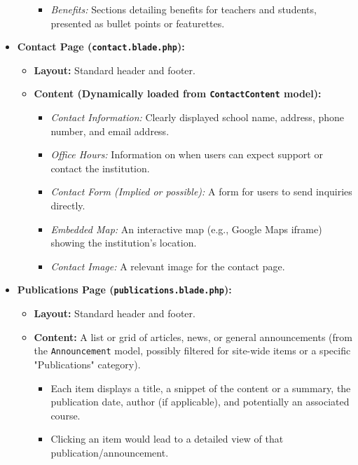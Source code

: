 \documentclass[12pt,a4paper]{article}
\begin{document}
\begin{itemize}
\begin{itemize}
\begin{itemize}
            \item \textit{Benefits:} Sections detailing benefits for teachers and students, presented as bullet points or featurettes.
        \end{itemize}
    \end{itemize}
    \item \textbf{Contact Page (\texttt{contact.blade.php}):}
    \begin{itemize}
        \item \textbf{Layout:} Standard header and footer.
        \item \textbf{Content (Dynamically loaded from \texttt{ContactContent} model):}
        \begin{itemize}
            \item \textit{Contact Information:} Clearly displayed school name, address, phone number, and email address.
            \item \textit{Office Hours:} Information on when users can expect support or contact the institution.
            \item \textit{Contact Form (Implied or possible):} A form for users to send inquiries directly.
            \item \textit{Embedded Map:} An interactive map (e.g., Google Maps iframe) showing the institution's location.
            \item \textit{Contact Image:} A relevant image for the contact page.
        \end{itemize}
    \end{itemize}
    \item \textbf{Publications Page (\texttt{publications.blade.php}):}
    \begin{itemize}
        \item \textbf{Layout:} Standard header and footer.
        \item \textbf{Content:} A list or grid of articles, news, or general announcements (from the \texttt{Announcement} model, possibly filtered for site-wide items or a specific "Publications" category).
        \begin{itemize}
            \item Each item displays a title, a snippet of the content or a summary, the publication date, author (if applicable), and potentially an associated course.
            \item Clicking an item would lead to a detailed view of that publication/announcement.
        \end{itemize}
    \end{itemize}
\end{itemize}
\end{document}
